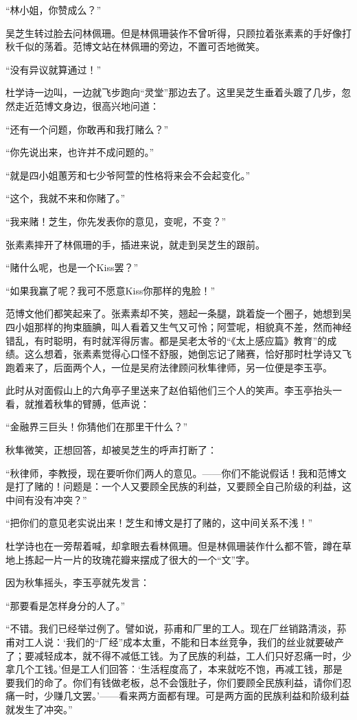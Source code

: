 \par “林小姐，你赞成么？”
\par 吴芝生转过脸去问林佩珊。但是林佩珊装作不曾听得，只顾拉着张素素的手好像打秋千似的荡着。范博文站在林佩珊的旁边，不置可否地微笑。
\par “没有异议就算通过！”
\par 杜学诗一边叫，一边就飞步跑向“灵堂”那边去了。这里吴芝生垂着头踱了几步，忽然走近范博文身边，很高兴地问道：
\par “还有一个问题，你敢再和我打赌么？”
\par “你先说出来，也许并不成问题的。”
\par “就是四小姐蕙芳和七少爷阿萱的性格将来会不会起变化。”
\par “这个，我就不来和你赌了。”
\par “我来赌！芝生，你先发表你的意见，变呢，不变？”
\par 张素素摔开了林佩珊的手，插进来说，就走到吴芝生的跟前。
\par “赌什么呢，也是一个Kiss罢？”
\par “如果我赢了呢？我可不愿意Kiss你那样的鬼脸！”
\par 范博文他们都笑起来了。张素素却不笑，翘起一条腿，跳着旋一个圈子，她想到吴四小姐那样的拘束腼腆，叫人看着又生气又可怜；阿萱呢，相貌真不差，然而神经错乱，有时聪明，有时就浑得厉害。都是吴老太爷的“《太上感应篇》教育”的成绩。这么想着，张素素觉得心口怪不舒服，她倒忘记了赌赛，恰好那时杜学诗又飞跑着来了，后面两个人，一位是吴府法律顾问秋隼律师，另一位便是李玉亭。
\par 此时从对面假山上的六角亭子里送来了赵伯韬他们三个人的笑声。李玉亭抬头一看，就推着秋隼的臂膊，低声说：
\par “金融界三巨头！你猜他们在那里干什么？”
\par 秋隼微笑，正想回答，却被吴芝生的呼声打断了：
\par “秋律师，李教授，现在要听你们两人的意见。——你们不能说假话！我和范博文是打了赌的！问题是：一个人又要顾全民族的利益，又要顾全自己阶级的利益，这中间有没有冲突？”
\par “把你们的意见老实说出来！芝生和博文是打了赌的，这中间关系不浅！”
\par 杜学诗也在一旁帮着喊，却拿眼去看林佩珊。但是林佩珊装作什么都不管，蹲在草地上拣起一片一片的玫瑰花瓣来摆成了很大的一个“文”字。
\par 因为秋隼摇头，李玉亭就先发言：
\par “那要看是怎样身分的人了。”
\par “不错。我们已经举过例了。譬如说，荪甫和厂里的工人。现在厂丝销路清淡，荪甫对工人说：‘我们的“厂经”成本太重，不能和日本丝竞争，我们的丝业就要破产了；要减轻成本，就不得不减低工钱。为了民族的利益，工人们只好忍痛一时，少拿几个工钱。’但是工人们回答：‘生活程度高了，本来就吃不饱，再减工钱，那是要我们的命了。你们有钱做老板，总不会饿肚子，你们要顾全民族利益，请你们忍痛一时，少赚几文罢。’——看来两方面都有理。可是两方面的民族利益和阶级利益就发生了冲突。”
